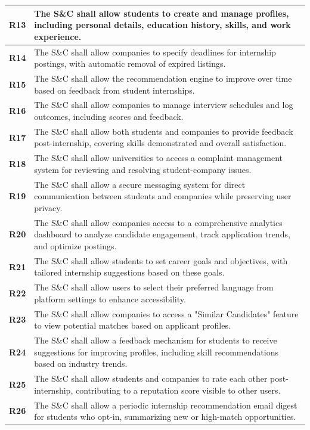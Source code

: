 \begin{longtable}{|p{}|p{}|}
\textbf{R13} & The S\&C shall allow students to create and manage profiles, including personal details, education history, skills, and work experience. \\ 
\hline
\textbf{R14} & The S\&C shall allow companies to specify deadlines for internship postings, with automatic removal of expired listings. \\ 
\hline
\textbf{R15} & The S\&C shall allow the recommendation engine to improve over time based on feedback from student internships. \\ 
\hline
\textbf{R16} & The S\&C shall allow companies to manage interview schedules and log outcomes, including scores and feedback. \\ 
\hline
\textbf{R17} & The S\&C shall allow both students and companies to provide feedback post-internship, covering skills demonstrated and overall satisfaction. \\ 
\hline
\textbf{R18} & The S\&C shall allow universities to access a complaint management system for reviewing and resolving student-company issues. \\ 
\hline
\textbf{R19} & The S\&C shall allow a secure messaging system for direct communication between students and companies while preserving user privacy. \\ 
\hline
\textbf{R20} & The S\&C shall allow companies access to a comprehensive analytics dashboard to analyze candidate engagement, track application trends, and optimize postings. \\ 
\hline
\textbf{R21} & The S\&C shall allow students to set career goals and objectives, with tailored internship suggestions based on these goals. \\ 
\hline
\textbf{R22} & The S\&C shall allow users to select their preferred language from platform settings to enhance accessibility. \\ 
\hline
\textbf{R23} & The S\&C shall allow companies to access a "Similar Candidates" feature to view potential matches based on applicant profiles. \\ 
\hline
\textbf{R24} & The S\&C shall allow a feedback mechanism for students to receive suggestions for improving profiles, including skill recommendations based on industry trends. \\ 
\hline
\textbf{R25} & The S\&C shall allow students and companies to rate each other post-internship, contributing to a reputation score visible to other users. \\ 
\hline
\textbf{R26} & The S\&C shall allow a periodic internship recommendation email digest for students who opt-in, summarizing new or high-match opportunities. \\ 

\end{longtable}
